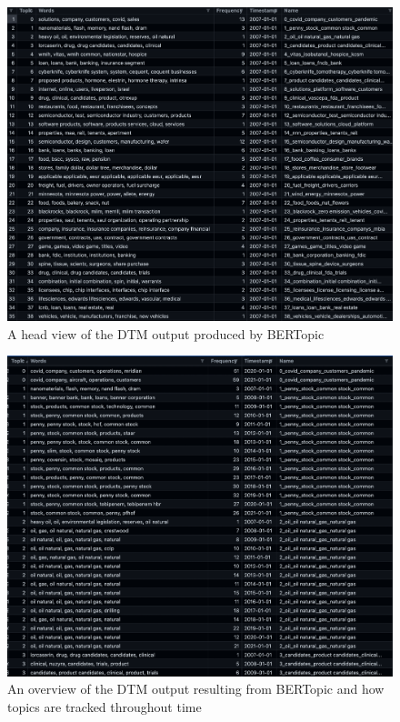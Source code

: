 \documentclass[12pt,MSc,a4paper,oneside]{muthesis}
\begin{document}
    \label{appendix:11}
    \begin{figure}[h]
      \centering
      \includegraphics[scale=0.35]{images/DTM head.png}
      \caption{A head view of the DTM output produced by BERTopic}
    \end{figure}

    \label{appendix:12}
    \begin{figure}[h]
      \centering
      \includegraphics[scale=0.3]{images/DTM Output Example.png}
      \caption{An overview of the DTM output resulting from BERTopic and how topics are tracked throughout time}
    \end{figure}
\end{document}
